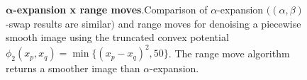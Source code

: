 \begin{figure}
{}%
%
\caption{\textbf{$\mathbf{\alpha}$-expansion x range moves}\cite{veksler07graph}.Comparison of $\alpha$-expansion $\big( (\alpha,\beta)$-swap results are similar$\big)$ and range moves for denoising a piecewise smooth image using the truncated convex potential $\phi_2(x_p,x_q) = \min \{ (x_p-x_q)^2,50 \}$. The range move algorithm returns a smoother image than $\alpha$-expansion. }
\label{ch2:fig:move-making-examples}
\end{figure}

